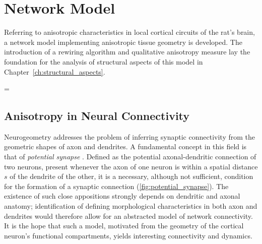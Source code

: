 \chapter{Network Model}\label{ch:Network Model} 

Referring to anisotropic characteristics in local cortical circuits of
the rat's brain, a network model implementing anisotropic tissue
geometry is developed. The introduction of a rewiring algorithm and
qualitative anisotropy measure %
lay the foundation for the analysis of structural aspects of this
model in Chapter~\ref{ch:structural_aspects}.

\parskip = \baselineskip %
\setlength{\parindent}{0pt}


\section{Anisotropy in Neural Connectivity}\label{sec:biol_anisotropy}







Neurogeometry addresses the problem of inferring
synaptic connectivity from the geometric shapes of axon and
dendrites. A fundamental concept in this field is that of
\textit{potential synapse}
\parencite{Stepanyants2002}. Defined as the potential axonal-dendritic
connection of two neurons, present whenever the axon of one neuron is
within a spatial distance $s$ of the dendrite of the other, it is a
necessary, although not sufficient, condition for the formation of a
synaptic connection (\autoref{fig:potential_synapse}). The existence of such close
appositions strongly depends on dendritic and axonal anatomy;
identification of defining morphological characteristics in both axon
and dendrites would therefore allow for an abstracted model of network
connectivity. It is the hope that such a model, motivated from the
geometry of the cortical neuron's functional compartments, yields interesting
connectivity and dynamics.

